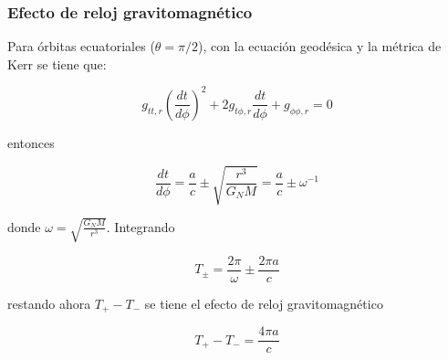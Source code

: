 \documentclass[aspectratio=169,10pt,usenames,dvipsnames,spanish]{beamer}
\begin{document}
\begin{frame}
\frametitle{Efecto de reloj gravitomagnético}

Para órbitas ecuatoriales ($\theta=\pi/2$), con la ecuación geodésica y la métrica de Kerr se tiene que:

\begin{equation}
g_{tt,r}\left(\frac{dt}{d\phi}\right)^2
+2 g_{t\phi,r}\frac{dt}{d\phi}
+g_{\phi\phi,r}=0
\end{equation}

entonces

\begin{equation}
\frac{dt}{d\phi}=\frac{a}{c}\pm \sqrt{\frac{r^3}{G_N M}}=\frac{a}{c}\pm \omega^{-1}
\end{equation}

donde $\omega=\sqrt{\frac{G_N M}{r^3}}$. Integrando

\begin{equation}
T_{\pm}=\frac{2\pi}{\omega}\pm \frac{2\pi a}{c}
\end{equation}

restando ahora $T_+-T_-$ se tiene el efecto de reloj gravitomagnético

\begin{equation}
T_+ - T_- = \frac{4\pi a}{c}
\end{equation}

\end{frame}


\end{document}
